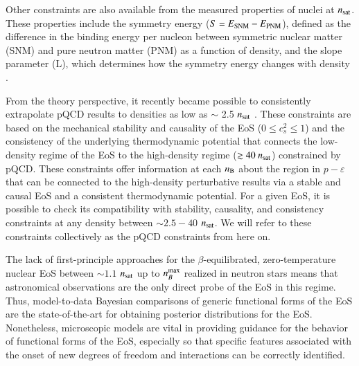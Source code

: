 \documentclass[aps,prd,nofootinbib,tightenlines,notitlepage,floatfix,superscriptaddress,showkeys,twocolumn]{revtex4-1}
\newcommand{\nsat}{$n_{\rm sat}$ }
\begin{document}
Other constraints are also available from the measured properties of nuclei at $n_{\rm sat}$. These properties include the symmetry energy ($S = E_{\rm SNM} -E_{\rm PNM}$), defined as the difference in the binding energy per nucleon between symmetric nuclear matter (SNM) and pure neutron matter (PNM) as a function of density, and the slope parameter (L), which determines how the symmetry energy changes with density \cite{Tsang:2012se,Li:2019xxz,Drischler:2020hwi,Drischler:2020yad,PREX:2021umo,Reed:2021nqk,Yue:2021yfx}. 

From the theory perspective, it recently became possible to consistently extrapolate pQCD results to densities as low as $\sim$ 2.5 \nsat \cite{Rhoades:1974fn, Gorda:2022jvk}. These constraints are based on the mechanical stability and causality of the EoS ($0 \leq c_s^2 \leq 1 $) and the consistency of the underlying thermodynamic potential that connects the low-density regime of the EoS to the high-density regime ($\gtrsim 40 \ n_{\rm sat}$) constrained by pQCD. These constraints offer information at each $n_{\rm B}$ about the region in $p-\varepsilon$ that can be connected to the high-density perturbative results via a stable and causal EoS and a consistent thermodynamic potential. For a given EoS, it is possible to check its compatibility with stability, causality, and consistency constraints at any density between $\sim 2.5 - 40$ $n_{\rm sat}$. We will refer to these constraints collectively as the pQCD constraints from here on. 

The lack of first-principle approaches for the $\beta$-equilibrated, zero-temperature nuclear EoS between $\sim 1.1$ $n_{\rm sat}$ up to $n^{\rm max}_{B}$ realized in neutron stars means that astronomical observations are the only direct probe of the EoS in this regime. Thus, model-to-data Bayesian comparisons of generic functional forms of the EoS are the state-of-the-art for obtaining posterior distributions for the EoS. Nonetheless, microscopic models are vital in providing guidance for the behavior of functional forms of the EoS, especially so that specific features associated with the onset of new degrees of freedom and interactions can be correctly identified. 
\end{document}
